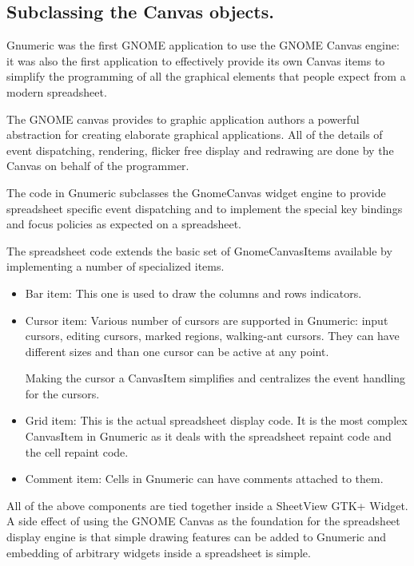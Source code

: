 \documentclass[12pt,twoside,twocolumn]{article}
\begin{document}
\subsection{Subclassing the Canvas objects.}

Gnumeric was the first GNOME application to use the GNOME Canvas
engine: it was also the first application to effectively provide its
own Canvas items to simplify the programming of all the graphical
elements that people expect from a modern spreadsheet.

The GNOME canvas provides to graphic application authors a powerful
abstraction for creating elaborate graphical applications.  All of the
details of event dispatching, rendering, flicker free display and
redrawing are done by the Canvas on behalf of the programmer.

The code in Gnumeric subclasses the GnomeCanvas widget engine to
provide spreadsheet specific event dispatching and to implement the
special key bindings and focus policies as expected on a spreadsheet.

The spreadsheet code extends the basic set of GnomeCanvasItems
available by implementing a number of specialized items.   

\begin{itemize}

	\item {Bar item:} This one is used to draw the columns and
	rows indicators.  

	\item {Cursor item:} Various number of cursors are supported
	in Gnumeric: input cursors, editing cursors, marked regions,
	walking-ant cursors.  They can have different sizes and than
	one cursor can be active at any point.

	Making the cursor a CanvasItem simplifies and centralizes the
	event handling for the cursors.

	\item {Grid item:} This is the actual spreadsheet display
	code.  It is the most complex CanvasItem in Gnumeric as it
	deals with the spreadsheet repaint code and the cell repaint
	code.

	\item {Comment item:} Cells in Gnumeric can have comments
	attached to them.   

\end{itemize}

All of the above components are tied together inside a SheetView GTK+
Widget.  A side effect of using the GNOME Canvas as the foundation for
the spreadsheet display engine is that simple drawing features can be
added to Gnumeric and embedding of arbitrary widgets inside a
spreadsheet is simple.
\end{document}
